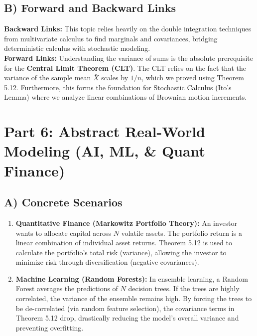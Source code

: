 \documentclass[11pt, a4paper]{article}
\theoremstyle{definition}
\theoremstyle{remark}
\begin{document}
\subsection{B) Forward and Backward Links}
\textbf{Backward Links:} This topic relies heavily on the double integration techniques from multivariate calculus to find marginals and covariances, bridging deterministic calculus with stochastic modeling. \\
\textbf{Forward Links:} Understanding the variance of sums is the absolute prerequisite for the \textbf{Central Limit Theorem (CLT)}. The CLT relies on the fact that the variance of the sample mean $\bar{X}$ scales by $1/n$, which we proved using Theorem 5.12. Furthermore, this forms the foundation for Stochastic Calculus (Ito's Lemma) where we analyze linear combinations of Brownian motion increments.

\section{Part 6: Abstract Real-World Modeling (AI, ML, \& Quant Finance)}

\subsection{A) Concrete Scenarios}
\begin{enumerate}
    \item \textbf{Quantitative Finance (Markowitz Portfolio Theory):} An investor wants to allocate capital across $N$ volatile assets. The portfolio return is a linear combination of individual asset returns. Theorem 5.12 is used to calculate the portfolio's total risk (variance), allowing the investor to minimize risk through diversification (negative covariances).
    \item \textbf{Machine Learning (Random Forests):} In ensemble learning, a Random Forest averages the predictions of $N$ decision trees. If the trees are highly correlated, the variance of the ensemble remains high. By forcing the trees to be de-correlated (via random feature selection), the covariance terms in Theorem 5.12 drop, drastically reducing the model's overall variance and preventing overfitting.
\end{enumerate}
\end{document}

